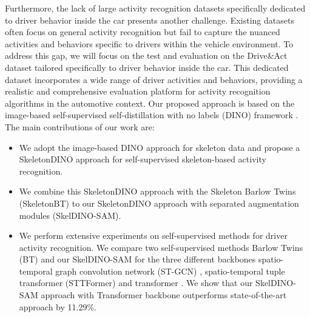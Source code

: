 Furthermore, the lack of large activity recognition datasets specifically dedicated to driver behavior inside the car presents another challenge. Existing datasets often focus on general activity recognition but fail to capture the nuanced activities and behaviors specific to drivers within the vehicle environment. To address this gap, we will focus on the test and evaluation on the Drive\&Act dataset \cite{drive_and_act_2019_iccv} tailored specifically to driver behavior inside the car. This dedicated dataset incorporates a wide range of driver activities and behaviors, providing a realistic and comprehensive evaluation platform for activity recognition algorithms in the automotive context. 
Our proposed approach is based on the image-based self-supervised self-distillation with no labels (DINO) framework \cite{caron2021emerging}. 
The main contributions of our work are:
\begin{itemize}
\item[1)]
We adopt the image-based DINO approach \cite{caron2021emerging} for skeleton data and propose a SkeletonDINO approach for self-supervised skeleton-based activity recognition.
\item[2)]
We combine this SkeletonDINO approach with the Skeleton Barlow Twins (SkeletonBT) \cite{zhou2023self} to our SkeletonDINO approach with separated augmentation modules (SkelDINO-SAM).
\item[3)]
We perform extensive experiments on self-supervised methods for driver activity recognition. We compare two self-supervised methods Barlow Twins (BT) \cite{zbontar2021barlow} and our SkelDINO-SAM for the three different backbones spatio-temporal graph convolution network (ST-GCN) \cite{yan2018spatial}, spatio-temporal tuple transformer (STTFormer) \cite{qiu2022spatio} and transformer \cite{vaswani2017attention}. We show that our SkelDINO-SAM approach with Transformer backbone outperforms state-of-the-art approach by 11.29\%.

\end{itemize}
